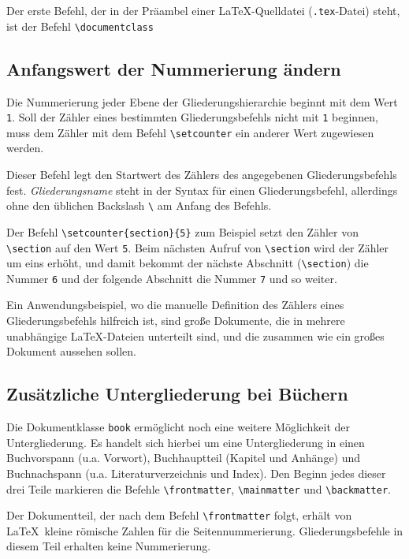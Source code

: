 Der erste Befehl, der in der Präambel einer \LaTeX-Quelldatei (\verb!.tex!-Datei) steht, ist der Befehl \verb!\documentclass!
\begin{document}
\subsection{Anfangswert der Nummerierung ändern}

Die Nummerierung jeder Ebene der Gliederungshierarchie beginnt mit 
dem Wert \verb!1!. Soll der Zähler eines bestimmten 
Gliederungsbefehls nicht mit \verb!1! beginnen, muss dem Zähler mit dem 
Befehl \verb!\setcounter! ein anderer Wert zugewiesen werden.


Dieser Befehl legt den Startwert des Zählers des 
angegebenen Gliederungsbefehls fest. \textsl{Gliederungsname} steht in der Syntax
für einen Gliederungsbefehl, allerdings ohne 
den üblichen Backslash \verb!\! am Anfang des Befehls.

Der Befehl \verb!\setcounter{section}{5}! zum Beispiel setzt den Zähler von
\texttt{\textbackslash section} auf den Wert \verb!5!. Beim nächsten Aufruf von 
\texttt{\textbackslash section} wird der Zähler um eins erhöht, und damit bekommt der nächste
Abschnitt (\texttt{\textbackslash section}) die Nummer \verb!6! und 
der folgende Abschnitt die Nummer \verb!7! und so weiter. 

Ein Anwendungsbeispiel, wo die manuelle Definition des Zählers eines Gliederungsbefehls hilfreich ist, sind große Dokumente, die in mehrere unabhängige \LaTeX-Dateien unterteilt sind, und die zusammen wie ein großes Dokument aussehen sollen.





\subsection{Zusätzliche Untergliederung bei Büchern}

Die Dokumentklasse \verb!book! ermöglicht noch eine weitere Möglichkeit
der Untergliederung. Es handelt sich hierbei um eine Untergliederung in einen Buchvorspann (u.a. Vorwort), Buchhauptteil (Kapitel und Anhänge) und Buchnachspann (u.a.  Literaturverzeichnis und Index). Den Beginn jedes dieser drei Teile markieren die Befehle 
\verb!\frontmatter!, \verb!\mainmatter! und \verb!\backmatter!.

Der Dokumentteil, der nach dem Befehl \verb!\frontmatter! 
folgt, erhält von \LaTeX\ kleine römische Zahlen für die Seitennummerierung.
Gliederungsbefehle in diesem Teil erhalten keine Nummerierung. 
\end{document}
